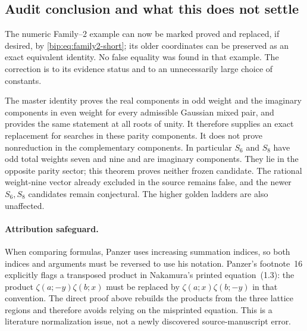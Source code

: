 \subsection{Audit conclusion and what this does not settle}
The numeric Family--2 example can now be marked proved and replaced,
if desired, by \eqref{bip:eq:family2-short}; its older coordinates can
be preserved as an exact equivalent identity. No false equality was
found in that example. The correction is to its evidence status and
to an unnecessarily large choice of constants.

The master identity proves the real components in odd weight and the
imaginary components in even weight for every admissible Gaussian
mixed pair, and provides the same statement at all roots of unity.
It therefore supplies an exact replacement for searches in these
parity components. It does not prove nonreduction in the complementary
components.
In particular $S_6$ and $S_8$ have odd total weights seven and nine
and are imaginary components. They lie in the opposite parity sector;
this theorem proves neither frozen candidate. The rational
weight-nine vector already excluded in the source remains false, and
the newer $S_6,S_8$ candidates remain conjectural. The higher golden
ladders are also unaffected.

\paragraph{Attribution safeguard.}
When comparing formulas, Panzer uses increasing summation indices,
so both indices and arguments must be reversed to use his notation.
Panzer's footnote~16 explicitly flags a transposed product in
Nakamura's printed equation~(1.3): the product
$\zeta(a;-y)\zeta(b;x)$ must be replaced by
$\zeta(a;x)\zeta(b;-y)$ in that convention. The direct proof above
rebuilds the products from the three lattice regions and therefore
avoids relying on the misprinted equation. This is a literature
normalization issue, not a newly discovered source-manuscript error.

